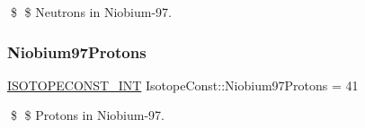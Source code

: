 \$ \$ Neutrons in Niobium-\/97. \mbox{\label{group___isotope_const-_niobium-_nb97_ga52d92eb9d263cf3c937551af02fef19b}} 
\subsubsection{\texorpdfstring{Niobium97\+Protons}{Niobium97Protons}}
{\footnotesize\ttfamily \mbox{\hyperlink{group___isotope_const-_macros_ga5f18360b3e99483a35c32d789e62621c}{I\+S\+O\+T\+O\+P\+E\+C\+O\+N\+S\+T\+\_\+\+I\+NT}} Isotope\+Const\+::\+Niobium97\+Protons = 41}

\$ \$ Protons in Niobium-\/97. 